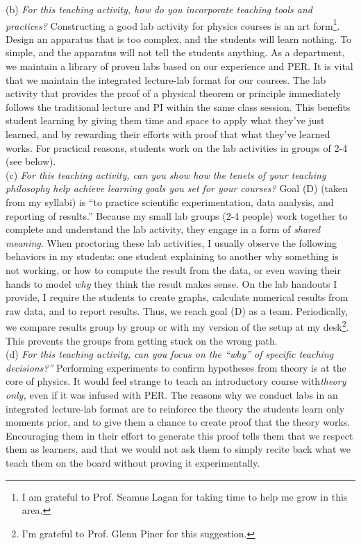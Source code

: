\documentclass[../../../main.tex]{subfiles}
\begin{document}
(b) \textit{For this teaching activity, how do you incorporate teaching tools and practices?}  Constructing a good lab activity for physics courses is an art form\footnote{I am grateful to Prof. Seamus Lagan for taking time to help me grow in this area.}.  Design an apparatus that is too complex, and the students will learn nothing.  To simple, and the apparatus will not tell the students anything.  As a department, we maintain a library of proven labs based on our experience and PER.  It is vital that we maintain the integrated lecture-lab format for our courses.  The lab activity that provides the proof of a physical theorem or principle immediately follows the traditional lecture and PI within the same class session.  This benefits student learning by giving them time and space to apply what they've just learned, and by rewarding their efforts with proof that what they've learned works.  For practical reasons, students work on the lab activities in groups of 2-4 (see below).
\\
\vspace{0.25cm}
(c) \textit{For this teaching activity, can you show how the tenets of your teaching philosophy help achieve learning goals you
set for your courses?}  Goal (D) (taken from my syllabi) is ``to practice scientific experimentation, data analysis, and reporting of results.''  Because my small lab groups (2-4 people) work together to complete and understand the lab activity, they engage in a form of \textit{shared meaning}.  When proctoring these lab activities, I usually observe the following behaviors in my students: one student explaining to another why something is not working, or how to compute the result from the data, or even waving their hands to model \textit{why} they think the result makes sense.  On the lab handouts I provide, I require the students to create graphs, calculate numerical results from raw data, and to report results.  Thus, we reach goal (D) as a team.  Periodically, we compare results group by group or with my version of the setup at my desk\footnote{I'm grateful to Prof. Glenn Piner for this suggestion.}.  This prevents the groups from getting stuck on the wrong path.
\\
\vspace{0.25cm}
(d) \textit{For this teaching activity, can you focus on the ``why'' of specific teaching decisions?''}  Performing experiments to confirm hypotheses from theory is at the core of physics.  It would feel strange to teach an introductory course with\textit{theory only,} even if it was infused with PER.  The reasons why we conduct labs in an integrated lecture-lab format are to reinforce the theory the students learn only moments prior, and to give them a chance to create proof that the theory works.  Encouraging them in their effort to generate this proof tells them that we respect them as learners, and that we would not ask them to simply recite back what we teach them on the board without proving it experimentally.
\end{document}
